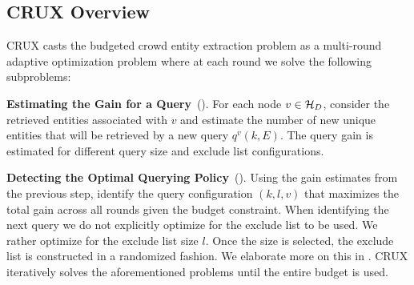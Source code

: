 %
\subsection{CRUX Overview}
\label{sec:framework}
CRUX casts the budgeted crowd entity extraction problem as a multi-round adaptive optimization problem where at each round we solve the following subproblems: 
\squishlist 
\item \textbf{Estimating the Gain for a Query}~(). For each node $v \in \mathcal{H}_D$, consider the retrieved entities associated with $v$ and estimate the number of new unique entities that will be retrieved by a new query $q^v(k,E)$. The query gain is estimated for different query size and exclude list configurations.
\item \textbf{Detecting the Optimal Querying Policy}~(). Using the gain estimates from the previous step, identify the query configuration $(k,l,v)$ that maximizes the total gain across all rounds given the budget constraint. When identifying the next query we do not explicitly optimize for the exclude list to be used. We rather optimize for the exclude list size $l$. Once the size is selected, the exclude list is constructed in a randomized fashion. We elaborate more on this in .
\squishend
CRUX iteratively solves the aforementioned problems until the entire budget is used. 
%

